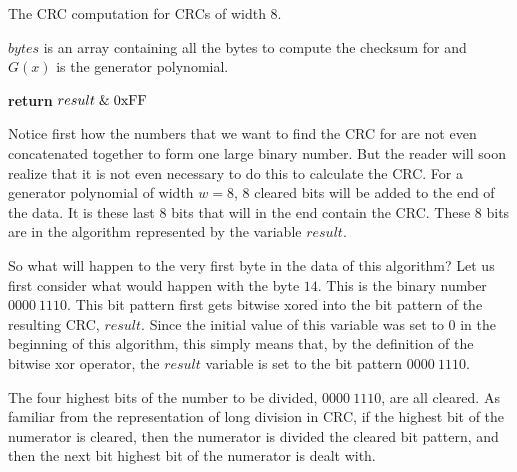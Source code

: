 \begin{algorithm}[H]
  \caption{The CRC computation for CRCs of width 8.}
  \label{alg:crc8-comp}
  \begin{algorithmic}[1]
    \Require $bytes$ is an array containing all the bytes to compute
    the checksum for and $G(x)$ is the generator polynomial.



    \Else
    \EndIf
    \EndRepeatn

    \EndForEach

    \State \textbf{return}  $result \mathrel{\&} \mathrm{0xFF}$
    \EndProcedure

  \end{algorithmic}
\end{algorithm}

Notice first how the numbers that we want to find the CRC for are not
even concatenated together to form one large binary number.  But the
reader will soon realize that it is not even necessary to do this to
calculate the CRC.  For a generator polynomial of width $w=8$, $8$
cleared bits will be added to the end of the data. It is these last
$8$ bits that will in the end contain the CRC. These 8 bits are in the
algorithm represented by the variable $result$.

So what will happen to the very first byte in the data of this
algorithm? Let us first consider what would happen with the byte
$14$. This is the binary number $0000\ 1110$. This bit pattern first
gets bitwise xored into the bit pattern of the resulting CRC,
$result$. Since the initial value of this variable was set to $0$ in
the beginning of this algorithm, this simply means that, by the
definition of the bitwise xor operator, the $result$ variable is set
to the bit pattern $0000\ 1110$.

The four highest bits of the number to be divided, $0000\ 1110$, are
all cleared. As familiar from the representation of long division in
CRC, if the highest bit of the numerator is cleared, then the
numerator is divided the cleared bit pattern, and then the next bit
highest bit of the numerator is dealt with.

